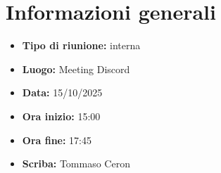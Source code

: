 \section{Informazioni generali}

\begin{itemize}
    \item \textbf{Tipo di riunione:} interna
    \item \textbf{Luogo:} Meeting Discord
    \item \textbf{Data:} 15/10/2025
    \item \textbf{Ora inizio:} 15:00
    \item \textbf{Ora fine:} 17:45
    \item \textbf{Scriba:} Tommaso Ceron
\end{itemize}